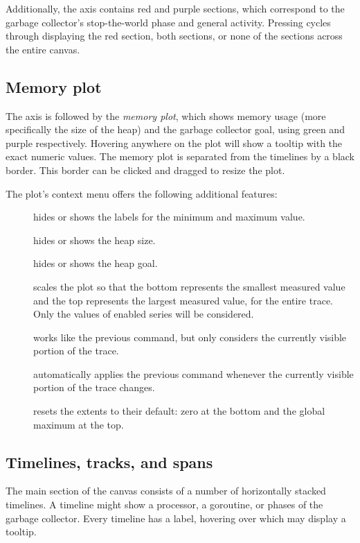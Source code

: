 \documentclass[10pt,letterpaper,oneside,openany,english]{memoir}
\newcommand{\noun}[1]{{\emph{#1}}}
\begin{document}
Additionally, the axis contains red and purple sections,
which correspond to the garbage collector's stop-the-world phase and general activity.
Pressing  cycles through displaying the red section, both sections, or none of the sections across the entire canvas.

\subsection{Memory plot}

The axis is followed by the \noun{memory plot}, which shows memory usage (more specifically the size of the heap) and the garbage collector goal, using green and purple respectively.
Hovering anywhere on the plot will show a tooltip with the exact numeric values.
The memory plot is separated from the timelines by a black border.
This border can be clicked and dragged to resize the plot.

The plot's context menu offers the following additional features:

\begin{description}
\item[] hides or shows the labels for the minimum and maximum value.
\item[] hides or shows the heap size.
\item[] hides or shows the heap goal.
\item[] scales the plot so that the bottom represents the smallest measured value and the top represents the largest measured value, for the entire trace.
  Only the values of enabled series will be considered.
\item[] works like the previous command, but only considers the currently visible portion of the trace.
\item[] automatically applies the previous command whenever the currently visible portion of the trace changes.
\item[] resets the extents to their default: zero at the bottom and the global maximum at the top.
\end{description}

\subsection{Timelines, tracks, and spans}
The main section of the canvas consists of a number of horizontally stacked timelines.
A timeline might show a processor, a goroutine, or phases of the garbage collector.
Every timeline has a label, hovering over which may display a tooltip.
\end{document}
